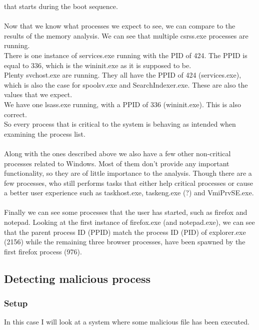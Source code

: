 \documentclass[a4paper]{article}
\begin{document}
that starts during the boot sequence. \\\\
%
Now that we know what processes we expect to see, we can compare to the results of the memory
analysis. We can see that multiple csrss.exe processes are running. \\
There is one instance of services.exe running with the PID of 424. The PPID is equal to 336, which
is the wininit.exe as it is supposed to be. \\
Plenty svchost.exe are running. They all have the PPID of 424 (services.exe), which is also the
case for spoolsv.exe and SearchIndexer.exe. These are also the values that we expect. \\
We have one lsass.exe running, with a PPID of 336 (wininit.exe). This is also correct. \\
So every process that is critical to the system is behaving as intended when examining the process
list. \\\\
%
Along with the ones described above we also have a few other non-critical processes related to
Windows. Most of them don't provide any important functionality, so they are of little importance
to the analysis. Though there are a few processes, who still performs tasks that either
help critical processes or cause a better user experience such as taskhost.exe, taskeng.exe (?) and VmiPrvSE.exe. \\\\
%
%
Finally we can see some processes that the user has started, such as firefox and notepad. Looking at the first instance of firefox.exe (and notepad.exe), we can see that the parent process ID (PPID) match the process ID (PID) of explorer.exe (2156) while the remaining three browser processes, have been spawned by the first firefox process (976). 


\newpage
\subsection{Detecting malicious process}
\subsubsection{Setup} %
In this case I will look at a system where some malicious file has been executed. \\ %
%
\end{document}
